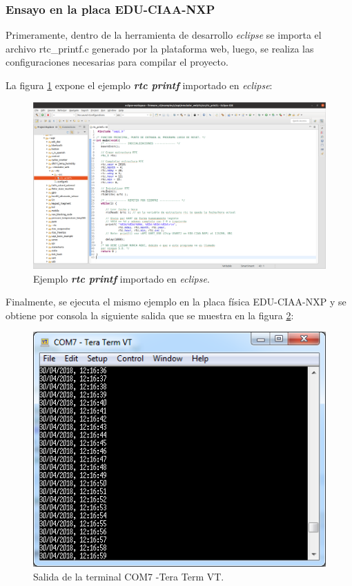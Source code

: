 \subsubsection{Ensayo en la placa EDU-CIAA-NXP} 

Primeramente, dentro de la herramienta de desarrollo \textit{eclipse} se importa el archivo \textquotedbl rtc\_printf.c\textquotedbl{} generado por la plataforma web, luego, se realiza las configuraciones necesarias para compilar el proyecto. 

La figura \ref{fig:rtcprintfEclipse} expone el ejemplo \textit{\textbf{rtc printf}} importado en \textit{eclipse}: 

\begin{figure}[ht]
	\centering
	\includegraphics[scale=.20]{./Figures/rtcprintfEclipse.png}
	\caption{Ejemplo \textit{\textbf{rtc printf}} importado en \textit{eclipse}.}
	\label{fig:rtcprintfEclipse}
\end{figure}


Finalmente, se ejecuta el mismo ejemplo en la placa física EDU-CIAA-NXP y se obtiene por consola la siguiente salida que se muestra en la figura \ref{fig:rtcprintfPlaca}:

\begin{figure}[ht]
	\centering
	\includegraphics[scale=.90]{./Figures/rtcprintfPlaca.png}
	\caption{Salida de la terminal COM7 -Tera Term VT.}
	\label{fig:rtcprintfPlaca}
\end{figure}



